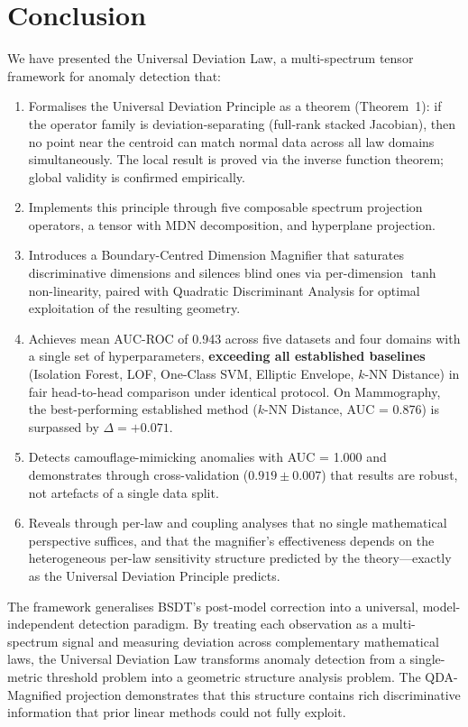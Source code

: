 \documentclass[journal]{IEEEtran}
\begin{document}
\section{Conclusion}
\label{sec:conclusion}

We have presented the Universal Deviation Law, a multi-spectrum tensor framework for anomaly detection that:

\begin{enumerate}
  \item Formalises the Universal Deviation Principle as a theorem (Theorem~1): if the operator family is deviation-separating (full-rank stacked Jacobian), then no point near the centroid can match normal data across all law domains simultaneously. The local result is proved via the inverse function theorem; global validity is confirmed empirically.
  \item Implements this principle through five composable spectrum projection operators, a tensor with MDN decomposition, and hyperplane projection.
  \item Introduces a Boundary-Centred Dimension Magnifier that saturates discriminative dimensions and silences blind ones via per-dimension $\tanh$ non-linearity, paired with Quadratic Discriminant Analysis for optimal exploitation of the resulting geometry.
  \item Achieves mean AUC-ROC of 0.943 across five datasets and four domains with a single set of hyperparameters, \textbf{exceeding all established baselines} (Isolation Forest, LOF, One-Class SVM, Elliptic Envelope, $k$-NN Distance) in fair head-to-head comparison under identical protocol. On Mammography, the best-performing established method ($k$-NN Distance, AUC = 0.876) is surpassed by $\Delta{=}+0.071$.
  \item Detects camouflage-mimicking anomalies with AUC = 1.000 and demonstrates through cross-validation ($0.919 \pm 0.007$) that results are robust, not artefacts of a single data split.
  \item Reveals through per-law and coupling analyses that no single mathematical perspective suffices, and that the magnifier's effectiveness depends on the heterogeneous per-law sensitivity structure predicted by the theory---exactly as the Universal Deviation Principle predicts.
\end{enumerate}

The framework generalises BSDT's post-model correction into a universal, model-independent detection paradigm. By treating each observation as a multi-spectrum signal and measuring deviation across complementary mathematical laws, the Universal Deviation Law transforms anomaly detection from a single-metric threshold problem into a geometric structure analysis problem. The QDA-Magnified projection demonstrates that this structure contains rich discriminative information that prior linear methods could not fully exploit.
\end{document}
